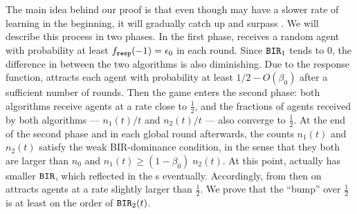The main idea behind our proof is that even though \alg[1] may have a
slower rate of learning in the beginning, it will gradually catch up
and surpass \alg[2]. We will describe this process in two phases. In
the first phase, \alg[1] receives a random agent with probability at
least $f_{\mathtt{resp}}(-1) = \epsilon_0$ in each round. Since $\mathtt{BIR}_1$ tends to 0,
the difference in  between the two algorithms is also
diminishing. Due to the \SoftMaxRandom response function, \alg[1]
attracts each agent with probability at least $1/2 - O(\beta_0)$ after
a sufficient number of rounds. Then the game enters the second phase:
both algorithms receive agents at a rate close to $\tfrac12$, and the
fractions of agents received by both algorithms --- $n_1(t)/t$ and
$n_2(t)/t$ --- also converge to $\tfrac12$. At the end of the second
phase and in each global round afterwards, the counts $n_1(t)$ and
$n_2(t)$ satisfy the weak BIR-dominance condition, in the sense that
they both are larger than $n_0$ and $n_1(t)\geq (1-\beta_0)\; n_2(t)$.
At this point, \alg[1] actually has smaller $\mathtt{BIR}$, which reflected in the {\PMR}s eventually. Accordingly, from then on \alg[1]
attracts agents at a rate slightly larger than $\tfrac12$. We prove
that the ``bump'' over $\tfrac12$ is at least on the order of
$\mathtt{BIR}_2(t)$.


